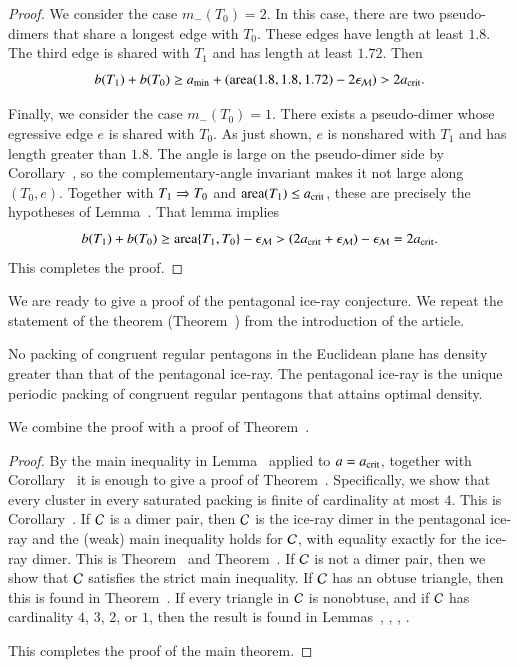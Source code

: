 \begin{proof}
We consider the case $m_-(T_0)=2$.  In this case, there are two
pseudo-dimers that share a longest edge with $T_0$.  These edges have
length at least $1.8$. The third edge is shared with $T_1$ and has
length at least $1.72$.  Then
\[
b(T_1)+b(T_0) 
\ge a_\text{min} + ({\operatorname{area}} (1.8,1.8,1.72) - 2\epsilon_{\mathcal M}) > 2a_\text{crit}.
\]

Finally, we consider the case $m_-(T_0)=1$.  There exists a
pseudo-dimer whose egressive edge $e$ is shared with $T_0$.
As just shown, $e$ is nonshared with $T_1$ and has length greater
than $1.8$.  The angle is large on the pseudo-dimer side by
Corollary~, so the complementary-angle invariant
makes it not large along $(T_0,e)$.  Together with
$T_1\Rightarrow T_0$ and ${\operatorname{area}}(T_1)\le a_\text{crit}$, these are precisely the
hypotheses of Lemma~.  That lemma
implies
\[
b(T_1) + b(T_0) \ge {\operatorname{area}}\{T_1,T_0\} - \epsilon_{\mathcal M} 
> (2a_\text{crit}  +\epsilon_{\mathcal M}) - \epsilon_{\mathcal M} = 2a_\text{crit}.
\]
This completes the proof.
\end{proof}

We are ready to give a proof of the pentagonal ice-ray conjecture. We
repeat the statement of the theorem (Theorem~) from the
introduction of the article.

\begin{theorem}   
  No packing of congruent regular pentagons in the Euclidean plane has
  density greater than that of the pentagonal ice-ray.  The pentagonal
  ice-ray is the unique periodic packing of congruent regular
  pentagons that attains optimal density.
\end{theorem}

We combine the proof with a proof of Theorem~.

\begin{proof}
  By the main inequality in Lemma~ applied to
  $a=a_\text{crit}$, together with Corollary~ it is enough to
  give a proof of Theorem~.  Specifically, we show that
  every cluster in every saturated packing is finite of cardinality at
  most $4$.  This is Corollary~.  If $\mathcal C$ is a dimer
  pair, then $\mathcal C$ is the ice-ray dimer in the pentagonal ice-ray and
  the (weak) main inequality holds for $\mathcal C$, with equality exactly for
  the ice-ray dimer.  This is Theorem~ and
  Theorem~.  If $\mathcal C$ is not a dimer pair, then we
  show that $\mathcal C$ satisfies the strict main inequality.  If $\mathcal C$ has an
  obtuse triangle, then this is found in Theorem~.  If
  every triangle in $\mathcal C$ is nonobtuse, and if $\mathcal C$ has cardinality
  $4$, $3$, $2$, or $1$, then the result is found in
  Lemmas~, , ,
  .

  This completes the proof of the main theorem.
\end{proof}

